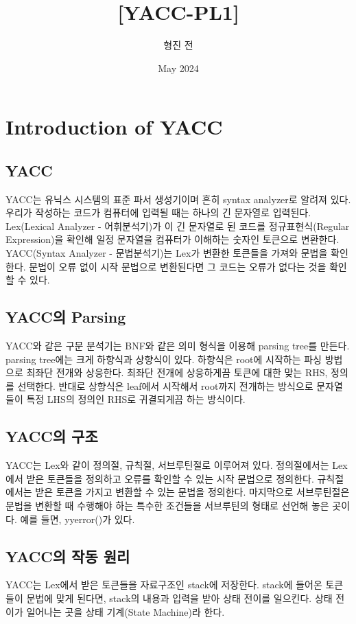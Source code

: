 \documentclass{article}
\title{[YACC-PL{1}]}
\author{형진 전}
\date{May 2024}
\begin{document}
\maketitle{}

\section{Introduction of YACC}
\subsection{YACC}
YACC는 유닉스 시스템의 표준 파서 생성기이며 흔히 syntax analyzer로 알려져 있다. 우리가 작성하는 코드가 컴퓨터에 입력될 때는 하나의 긴 문자열로 입력된다. Lex(Lexical Analyzer - 어휘분석기)가 이 긴 문자열로 된 코드를 정규표현식(Regular Expression)을 확인해 일정 문자열을 컴퓨터가 이해하는 숫자인 토큰으로 변환한다. YACC(Syntax Analyzer - 문법분석기)는 Lex가 변환한 토큰들을 가져와 문법을 확인한다. 문법이 오류 없이 시작 문법으로 변환된다면 그 코드는 오류가 없다는 것을 확인할 수 있다. 

\subsection{YACC의 Parsing}
YACC와 같은 구문 분석기는 BNF와 같은 의미 형식을 이용해 parsing tree를 만든다. parsing tree에는 크게 하향식과 상향식이 있다. 하향식은 root에 시작하는 파싱 방법으로 최좌단 전개와 상응한다. 최좌단 전개에 상응하게끔 토큰에 대한 맞는 RHS, 정의를 선택한다. 반대로 상향식은 leaf에서 시작해서 root까지 전개하는 방식으로 문자열들이 특정 LHS의 정의인 RHS로 귀결되게끔 하는 방식이다. 

\subsection{YACC의 구조}
YACC는 Lex와 같이 정의절, 규칙절, 서브루틴절로 이루어져 있다. 정의절에서는 Lex에서 받은 토큰들을 정의하고 오류를 확인할 수 있는 시작 문법으로 정의한다. 규칙절에서는 받은 토큰을 가지고 변환할 수 있는 문법을 정의한다. 마지막으로 서브루틴절은 문법을 변환할 때 수행해야 하는 특수한 조건들을 서브루틴의 형태로 선언해 놓은 곳이다. 예를 들면, yyerror()가 있다. 

\subsection{YACC의 작동 원리}
YACC는 Lex에서 받은 토큰들을 자료구조인 stack에 저장한다. stack에 들어온 토큰들이 문법에 맞게 된다면, stack의 내용과 입력을 받아 상태 전이를 일으킨다. 상태 전이가 일어나는 곳을 상태 기계(State Machine)라 한다. 
\end{document}
